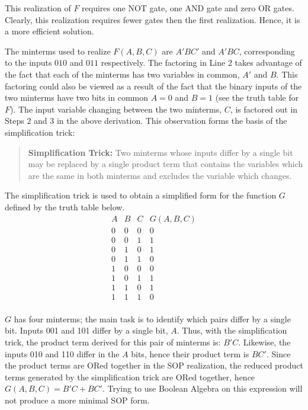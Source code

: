 This realization of $F$ requires one NOT gate, one AND gate and
zero OR gates.  Clearly, this realization requires fewer gates then the
first realization.  Hence, it is a more efficient solution.

The minterms used to realize $F(A,B,C)$ are $A'BC'$ and $A'BC$, corresponding
to the inputs $010$ and $011$ respectively.  The factoring in Line
2 takes advantage of the fact that each of the minterms has two
variables in common, $A'$ and $B$. This factoring could also be viewed
as a result of the fact that the binary inputs
of the two minterms have two bits in common $A=0$ and $B=1$ (see
the truth table for $F$).  The input variable changing between
the two minterms, $C$, is factored out in Steps 2 and 3 in the above
derivation.  This observation forms the basis of the simplification trick:

\begin{quote}
    \textbf{Simplification Trick:} Two minterms whose inputs differ by a single bit
    may be replaced by
    a single product term that contains the variables which are the same in
    both minterms and excludes the variable which changes.
\end{quote}

The simplification trick is used to obtain a simplified form
for the function $G$ defined by the truth table below.
$$
\begin{array}{c|c|c||c}
    A & B & C & G(A,B,C)  \\ \hline
    0 & 0 & 0 & 0 \\ \hline
    0 & 0 & 1 & 1 \\ \hline
    0 & 1 & 0 & 1 \\ \hline
    0 & 1 & 1 & 0 \\ \hline
    1 & 0 & 0 & 0 \\ \hline
    1 & 0 & 1 & 1 \\ \hline
    1 & 1 & 0 & 1 \\ \hline
    1 & 1 & 1 & 0 \\
\end{array} $$

$G$ has four minterms; the main task is to identify which
pairs differ by a single bit.  Inputs 001 and 101 differ by
a single bit, $A$.  Thus, with the simplification trick,
the product term derived for this pair of minterms is: $B'C$.
Likewise, the inputs 010 and 110 differ in the $A$ bits, hence
their product term is $BC'$.  Since the product terms are
ORed together in the SOP realization, the reduced product
terms generated by the simplification trick are ORed together,
hence $G(A,B,C)=B'C+BC'$.  Trying to use Boolean Algebra on
this expression will not produce a more minimal SOP form.

